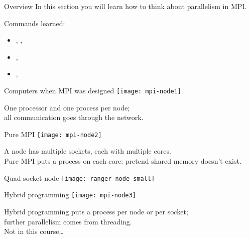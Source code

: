 
\begin{numberedframe}{Overview}
  In this section you will learn how to think about parallelism in
  MPI.

  Commands learned:
  \begin{itemize}
  \item
    , ,
  \item 
    , 
  \item 
    , 
  \end{itemize}
\end{numberedframe}


\begin{numberedframe}{Computers when MPI was designed}
  \texttt{[image: mpi-node1]}

  One processor and one  process per node;\\
  all communication goes through the network.
\end{numberedframe}

\begin{numberedframe}{Pure MPI}
  \texttt{[image: mpi-node2]}

  A node has multiple sockets, each with multiple cores.\\
  Pure MPI puts a process on each core: pretend shared memory doesn't exist.
\end{numberedframe}

\begin{numberedframe}{Quad socket node}
  \texttt{[image: ranger-node-small]}
\end{numberedframe}

\begin{numberedframe}{Hybrid programming}
  \texttt{[image: mpi-node3]}

  Hybrid programming puts a process per node or per socket;\\
  further parallelism comes from threading.\\
  Not in this course\ldots
\end{numberedframe}

